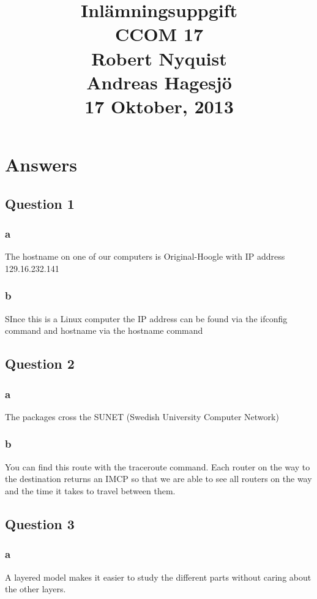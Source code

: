 \documentclass[oneside,a4paper,10pt]{report}
\title{
{\bf Inlämningsuppgift}\\
\vspace{0.2cm}
CCOM 17\\
\vspace{1cm}
Robert Nyquist\\Andreas Hagesjö\\
\vspace{1cm}
17 Oktober, 2013\\
}
\date{}
\begin{document}
\clearpage
\maketitle
\thispagestyle{empty}
\newpage


\newpage
\titleformat{\chapter}{\normalfont\huge\bfseries}{\thechapter}{1em}{}
\tableofcontents
\thispagestyle{empty}
\pagestyle{plain}
\newpage

\chapter{Answers}
\section{Question 1}
\subsection{a}
The hostname on one of our computers is Original-Hoogle with IP address 129.16.232.141
\subsection{b}
SInce this is a Linux computer the IP address can be found via the ifconfig command and hostname via the hostname command
\section{Question 2}
\subsection{a}
The packages cross the SUNET (Swedish University Computer Network)
\subsection{b}
You can find this route with the traceroute command.
Each router on the way to the destination returns an IMCP so that we are able to see all routers on the way and the time it takes to travel between them.
\section{Question 3}
\subsection{a}
A layered model makes it easier to study the different parts without caring about the other layers.
\end{document}
